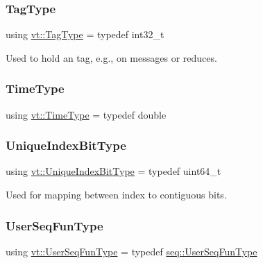 \mbox{\label{namespacevt_a84ab281dae04a52a4b243d6bf62d0e52}} 
\subsubsection{\texorpdfstring{Tag\+Type}{TagType}}
{\footnotesize\ttfamily using \hyperlink{namespacevt_a84ab281dae04a52a4b243d6bf62d0e52}{vt\+::\+Tag\+Type} = typedef int32\+\_\+t}



Used to hold an tag, e.\+g., on messages or reduces. 

\mbox{\label{namespacevt_a876a9d0cd5a952859c72de8a46881442}} 
\subsubsection{\texorpdfstring{Time\+Type}{TimeType}}
{\footnotesize\ttfamily using \hyperlink{namespacevt_a876a9d0cd5a952859c72de8a46881442}{vt\+::\+Time\+Type} = typedef double}

\mbox{\label{namespacevt_a913e1f07b5228dd8bb64040dc6dcea14}} 
\subsubsection{\texorpdfstring{Unique\+Index\+Bit\+Type}{UniqueIndexBitType}}
{\footnotesize\ttfamily using \hyperlink{namespacevt_a913e1f07b5228dd8bb64040dc6dcea14}{vt\+::\+Unique\+Index\+Bit\+Type} = typedef uint64\+\_\+t}



Used for mapping between index to contiguous bits. 

\mbox{\label{namespacevt_affe11140b7cc6953030f1f158b40750c}} 
\subsubsection{\texorpdfstring{User\+Seq\+Fun\+Type}{UserSeqFunType}}
{\footnotesize\ttfamily using \hyperlink{namespacevt_affe11140b7cc6953030f1f158b40750c}{vt\+::\+User\+Seq\+Fun\+Type} = typedef \hyperlink{namespacevt_1_1seq_aeb4674d25dcb5d27248b68ec83fad2b6}{seq\+::\+User\+Seq\+Fun\+Type}}

